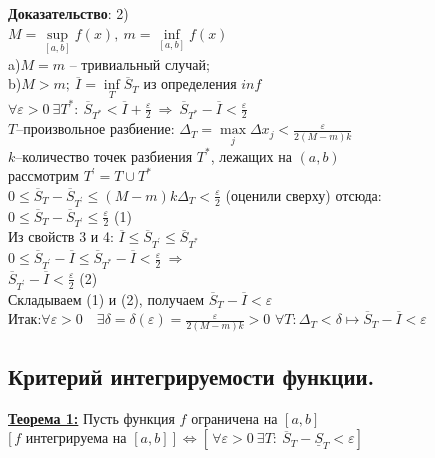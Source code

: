 \documentclass[a4paper,12pt]{article} %
\renewcommand {\leq}{\leqslant}
\begin{document}
\textbf{Доказательство}: 2)\\
$M=\sup\limits_{[a,b]}{f(x)},~m=\inf\limits_{[a,b]}{f(x)}$\\
a)$M=m$ -- тривиальный случай;\\
b)$M>m;~\overline{I}=\inf\limits_{T}{\overline{S}_T}$ из определения $inf$\\
$\forall \varepsilon>0~\exists T^{*}:~\overline{S}_{T^{*}}<\overline{I}+\frac{\varepsilon}{2}~\Rightarrow~\overline{S}_{T^{*}}-\overline{I}<\frac{\varepsilon}{2}$\\
$T$--произвольное разбиение: $\Delta_T=\max\limits_{j}{\Delta x_j}<\frac{\varepsilon}{2(M-m)k}$\\
$k$--количество точек разбиения $T^{*}$, лежащих на $(a,b)$\\
рассмотрим $T^{\prime}=T\cup T^{*}$\\
$0\leq \overline{S}_T-\overline{S}_{T^{\prime}}\leq (M-m)k\Delta_T<\frac{\varepsilon}{2}$ (оценили сверху) отсюда:\\
$0\leq \overline{S}_T-\overline{S}_{T^{\prime}}\leq \frac{\varepsilon}{2}$ (1)\\
Из свойств 3 и 4: $\overline{I}\leq \overline{S}_{T^{\prime}}\leq  \overline{S}_{T^{*}}$\\
$0\leq  \overline{S}_{T^{\prime}}-\overline{I}\leq \overline{S}_{T^{*}}-\overline{I}<\frac{\varepsilon}{2}~\Rightarrow$\\
$\overline{S}_{T^{\prime}}-\overline{I}<\frac{\varepsilon}{2}$ (2)\\
Складываем (1) и (2), получаем $ \overline{S}_T-\overline{I}<\varepsilon$\\
Итак:$\forall \varepsilon>0 \quad \exists \delta=\delta(\varepsilon)=\frac{\varepsilon}{2(M-m) k}>0$
$\forall T: \Delta_{T}<\delta \longmapsto\overline{S}_T-\overline{I}<\varepsilon$\\

\subsection{Критерий интегрируемости функции.}


\underline{\textbf{Теорема 1:}} Пусть функция $f$ ограничена на $[a,b]$\\
$[\,f$ интегрируема на $[a,b]~]\, \Leftrightarrow [\,\forall\varepsilon>0~\exists T:~\overline{S}_T-\underline{S}_T<\varepsilon]\,$\\
\end{document}
